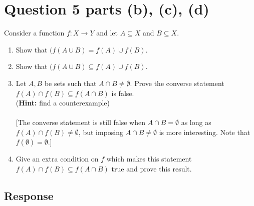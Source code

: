 \documentclass[13pt]{article}
\begin{document}
\section*{Question 5 parts (b), (c), (d)}
Consider a function $f : X \rightarrow Y$ and let $A \subseteq X$ and $B \subseteq X$.
\begin{enumerate}[label=(\alph*)]
\item Show that $(f(A \cup B) = f(A) \cup f(B)$.
\item Show that $(f(A \cup B) \subseteq f(A) \cup f(B)$.
\item Let $A, B$ be sets such that $A \cap B \neq \emptyset$. Prove the converse statement $f(A) \cap f(B)
  \subseteq f(A \cap B)$ is false. \\
  (\textbf{Hint:} find a counterexample) \\ \\
  {[The converse statement is still false when $A \cap B = \emptyset$ as long as $f(A) \cap f(B) \neq \emptyset$,
  but imposing $A \cap B \neq \emptyset$ is more interesting. Note that $f(\emptyset) = \emptyset$.]}
\item Give an extra condition on $f$ which makes this statement $f(A) \cap f(B) \subseteq f(A \cap B)$ true and
  prove this result.
\end{enumerate}

\subsection*{Response}





\newpage
\end{document}
